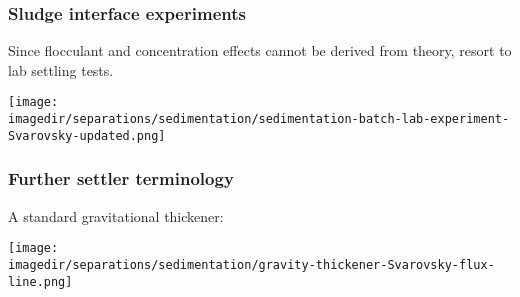 \begin{frame}\frametitle{Sludge interface experiments}
	Since flocculant and concentration effects cannot be derived from theory, resort to lab settling tests.
	\begin{center}
		\texttt{[image: \\imagedir/separations/sedimentation/sedimentation-batch-lab-experiment-Svarovsky-updated.png]}
	\end{center}
\end{frame}

\begin{frame}\frametitle{Further settler terminology}
	A standard gravitational thickener:

	\vspace{12pt}
	\begin{center}
		\texttt{[image: \\imagedir/separations/sedimentation/gravity-thickener-Svarovsky-flux-line.png]}
	\end{center}
\end{frame}

% 

